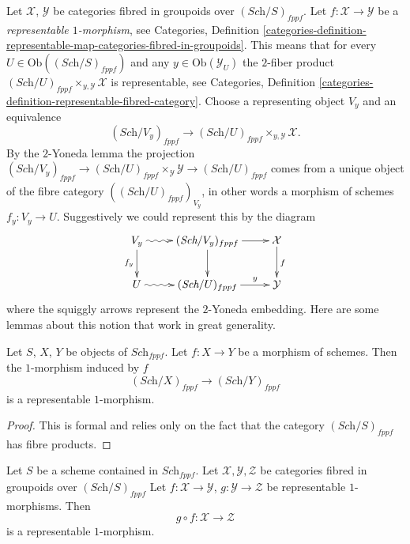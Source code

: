\medskip\noindent
Let $\mathcal{X}$, $\mathcal{Y}$ be categories fibred in groupoids
over $(\textit{Sch}/S)_{fppf}$. Let $f : \mathcal{X} \to \mathcal{Y}$
be a {\it representable $1$-morphism}, see
Categories, Definition
\ref{categories-definition-representable-map-categories-fibred-in-groupoids}.
This means that for every $U \in \text{Ob}((\textit{Sch}/S)_{fppf})$ and
any $y \in \text{Ob}(\mathcal{Y}_U)$ the $2$-fiber product
$(\textit{Sch}/U)_{fppf} \times_{y, \mathcal{Y}} \mathcal{X}$
is representable, see Categories,
Definition \ref{categories-definition-representable-fibred-category}.
Choose a representing object $V_y$ and an equivalence
$$
(\textit{Sch}/V_y)_{fppf}
\longrightarrow
(\textit{Sch}/U)_{fppf} \times_{y, \mathcal{Y}} \mathcal{X}.
$$
By the $2$-Yoneda lemma the projection
$(\textit{Sch}/V_y)_{fppf} \to
(\textit{Sch}/U)_{fppf} \times_\mathcal{Y} \mathcal{Y}
\to (\textit{Sch}/U)_{fppf}$ comes from a unique object of
the fibre category $((\textit{Sch}/U)_{fppf})_{V_y}$, in other words
a morphism of schemes $f_y : V_y \to U$. Suggestively we could
represent this by the diagram
$$
\xymatrix{
V_y \ar@{~>}[r] \ar[d]_{f_y} &
(\textit{Sch}/V_y)_{fppf} \ar[d] \ar[r] &
\mathcal{X} \ar[d]^f \\
U \ar@{~>}[r] &
(\textit{Sch}/U)_{fppf} \ar[r]^-y &
\mathcal{Y}
}
$$
where the squiggly arrows represent the $2$-Yoneda embedding.
Here are some lemmas about this notion that work in great generality.

\begin{lemma}
\label{lemma-morphism-schemes-gives-representable-transformation}
Let $S$, $X$, $Y$ be objects of $\textit{Sch}_{fppf}$.
Let $f : X \to Y$ be a morphism of schemes.
Then the $1$-morphism induced by $f$
$$
(\textit{Sch}/X)_{fppf} \longrightarrow (\textit{Sch}/Y)_{fppf}
$$
is a representable $1$-morphism.
\end{lemma}

\begin{proof}
This is formal and relies only on the fact that
the category $(\textit{Sch}/S)_{fppf}$ has fibre products.
\end{proof}

\begin{lemma}
\label{lemma-composition-representable-transformations}
Let $S$ be a scheme contained in $\textit{Sch}_{fppf}$.
Let $\mathcal{X}, \mathcal{Y}, \mathcal{Z}$
be categories fibred in groupoids over $(\textit{Sch}/S)_{fppf}$
Let $f : \mathcal{X} \to \mathcal{Y}$, $g : \mathcal{Y} \to \mathcal{Z}$
be representable $1$-morphisms. Then
$$
g \circ f : \mathcal{X} \longrightarrow \mathcal{Z}
$$
is a representable $1$-morphism.
\end{lemma}


